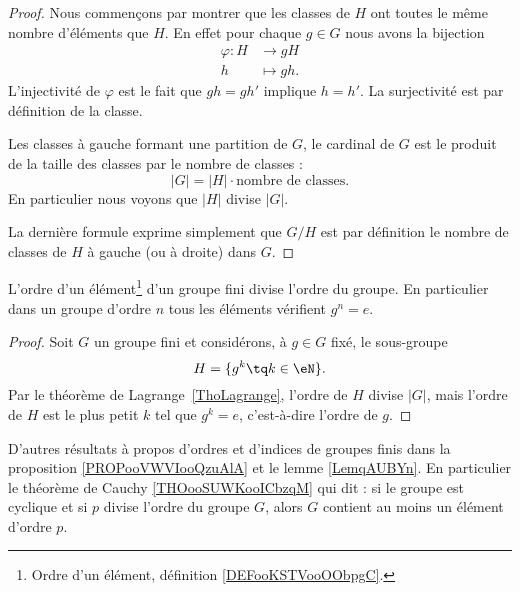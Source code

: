 \begin{proof}
	Nous commençons par montrer que les classes de \( H\) ont toutes le même nombre d'éléments que \( H\). En effet pour chaque \( g\in G\) nous avons la bijection
	\begin{equation}
		\begin{aligned}
			\varphi\colon H & \to gH      \\
			h               & \mapsto gh.
		\end{aligned}
	\end{equation}
	L'injectivité de \( \varphi\) est le fait que \( gh=gh'\) implique \( h=h'\). La surjectivité est par définition de la classe.

	Les classes à gauche formant une partition de \( G\), le cardinal de \( G\) est le produit de la taille des classes par le nombre de classes :
	\begin{equation}
		| G |=| H |\cdot\text{nombre de classes}.
	\end{equation}
	En particulier nous voyons que \( | H |\) divise \( | G |\).

	La dernière formule exprime simplement que \( G/H\) est par définition le nombre de classes de \( H\) à gauche (ou à droite) dans \( G\).
\end{proof}

\begin{corollary}       \label{CorpZItFX}
	L'ordre d'un élément\footnote{Ordre d'un élément, définition \ref{DEFooKSTVooOObpgC}.} d'un groupe fini divise l'ordre du groupe. En particulier dans un groupe d'ordre \( n\) tous les éléments vérifient \( g^n=e\).
\end{corollary}

\begin{proof}
	Soit \( G\) un groupe fini et considérons, à \( g \in G \) fixé, le sous-groupe
	\begin{equation}
		H=\{ g^k\tq k\in\eN \}.
	\end{equation}
	Par le théorème de Lagrange~\ref{ThoLagrange}, l'ordre de \( H\) divise \( | G |\), mais l'ordre de \( H\) est le plus petit \( k\) tel que \( g^k=e\), c'est-à-dire l'ordre de \( g\).
\end{proof}

D'autres résultats à propos d'ordres et d'indices de groupes finis dans la proposition \ref{PROPooVWVIooQzuAlA} et le lemme \ref{LemqAUBYn}. En particulier le théorème de Cauchy \ref{THOooSUWKooICbzqM} qui dit : si le groupe est cyclique et si \( p\) divise l'ordre du groupe \( G\), alors \( G\) contient au moins un élément d'ordre \( p\).

